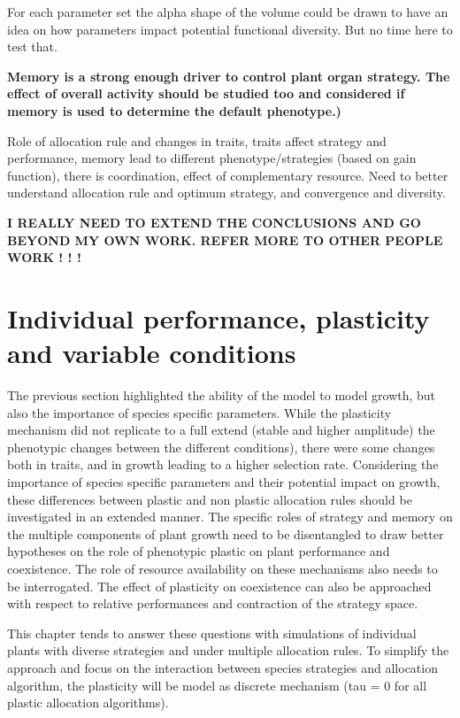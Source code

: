 For each parameter set the alpha shape of the volume could be drawn to have an idea on how parameters impact potential functional diversity. But no time here to test that.


\textbf{Memory is a strong enough driver to control plant organ strategy. The effect of overall activity should be studied too and considered if memory is used to determine the default phenotype.)}

Role of allocation rule and changes in traits, traits affect strategy and performance, memory lead to different phenotype/strategies (based on gain function), there is coordination, effect of complementary resource. Need to better understand allocation rule and optimum strategy, and convergence and diversity. 

\textbf{I REALLY NEED TO EXTEND THE CONCLUSIONS AND GO BEYOND MY OWN WORK. REFER MORE TO OTHER PEOPLE WORK ! ! !}

\chapter{Individual performance, plasticity and variable conditions}

The previous section highlighted the ability of the model to model growth, but also the importance of species specific parameters. While the plasticity mechanism did not replicate to a full extend (stable and higher amplitude) the phenotypic changes between the  different conditions), there were some changes both in traits, and in growth leading to a higher selection rate. Considering the importance of species specific parameters and their potential impact on growth, these differences between plastic and non plastic allocation rules should be investigated in an extended manner. The specific roles of strategy and memory on the multiple components of plant growth need to be disentangled to draw better hypotheses on the role of phenotypic plastic on plant performance and coexistence. The role of resource availability on these mechanisms also needs to be interrogated. The effect of plasticity on coexistence can also be approached with respect to relative performances and contraction of the strategy space.

This chapter tends to answer these questions with simulations of individual plants with diverse strategies and under multiple allocation rules. To simplify the approach and focus on the interaction between species strategies and allocation algorithm, the plasticity will be model as discrete mechanism (tau = 0 for all plastic allocation algorithms).

